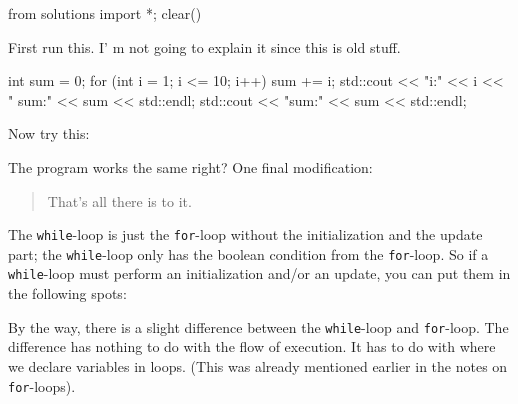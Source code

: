 \begin{python0}
from solutions import *; clear()
\end{python0}

First run this. I' m not going to explain it since this
is old stuff.
\begin{console}
int sum = 0;
for (int i = 1; i <= 10; i++)
{   
    sum += i;
    std::cout << "i:" << i << " sum:" << sum
              << std::endl;
}
std::cout << "sum:" << sum << std::endl;
\end{console}
Now try this:
The program works the same right? One final modification:
\begin{quote}
That's all there is to it.
\end{quote}

\begin{quote}
\end{quote}

The \texttt{while}-loop is just the \texttt{for}-loop without the
initialization and the update part; the \texttt{while}-loop only has the
boolean condition from the \texttt{for}-loop. So if a \texttt{while}-loop
must perform an initialization and/or an update, you can put them in the
following spots:
By the way, there is a slight difference between the \texttt{while}-loop
and \texttt{for}-loop. The difference has nothing to do with the flow of
execution. It has to do with where we declare variables in loops. (This
was already mentioned earlier in the notes on \texttt{for}-loops).


